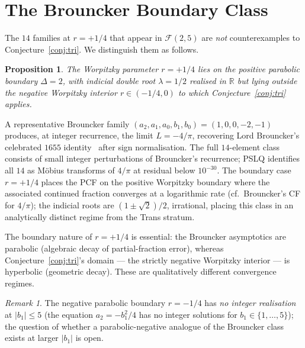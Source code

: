 \documentclass[11pt]{amsart}
\newtheorem{proposition}[theorem]{Proposition}
\theoremstyle{definition}
\theoremstyle{remark}
\newtheorem{remark}[theorem]{Remark}
\newcommand{\FF}{\mathcal{F}}
\begin{document}
\section{The Brouncker Boundary Class}\label{sec:brouncker}

The $14$ families at $r = +1/4$ that appear in $\FF(2,5)$ are
\emph{not} counterexamples to Conjecture~\ref{conj:tri}.  We
distinguish them as follows.

\begin{proposition}\label{prop:brouncker-boundary}
The Worpitzky parameter $r = +1/4$ lies on the positive parabolic
boundary $\Delta = 2$, with indicial double root $\lambda = 1/2$
realised in $\mathbb{R}$ but lying \emph{outside} the negative
Worpitzky interior $r \in (-1/4, 0)$ to which
Conjecture~\ref{conj:tri} applies.
\end{proposition}

A representative Brouncker family $(a_2, a_1, a_0, b_1, b_0) =
(1, 0, 0, -2, -1)$ produces, at integer recurrence, the limit
$L = -4/\pi$, recovering Lord Brouncker's celebrated
$1655$ identity~\cite{Brouncker} after sign normalisation.  The full
$14$-element class consists of small integer perturbations of
Brouncker's recurrence; PSLQ identifies all $14$ as M\"obius
transforms of $4/\pi$ at residual below $10^{-30}$.
The boundary case $r = +1/4$ places the PCF on the positive
Worpitzky boundary where the associated continued fraction
converges at a logarithmic rate (cf.\ Brouncker's CF for $4/\pi$);
the indicial roots are $(1 \pm \sqrt{2})/2$, irrational, placing
this class in an analytically distinct regime from the Trans
stratum.

The boundary nature of $r = +1/4$ is essential: the Brouncker
asymptotics are parabolic (algebraic decay of partial-fraction error),
whereas Conjecture~\ref{conj:tri}'s domain --- the strictly negative
Worpitzky interior --- is hyperbolic (geometric decay).  These are
qualitatively different convergence regimes.

\begin{remark}
The negative parabolic boundary $r = -1/4$ has \emph{no integer
realisation} at $|b_1| \le 5$ (the equation $a_2 = -b_1^2/4$ has no
integer solutions for $b_1 \in \{1,\dots,5\}$); the question of
whether a parabolic-negative analogue of the Brouncker class exists
at larger $|b_1|$ is open.
\end{remark}
\end{document}
